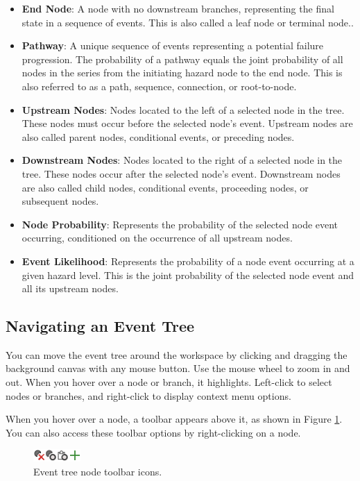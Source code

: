 \documentclass[
]{book}
\begin{document}
\begin{itemize}
\item
  \textbf{End Node}: A node with no downstream branches, representing the final state in a sequence of events. This is also called a leaf node or terminal node..
\item
  \textbf{Pathway}: A unique sequence of events representing a potential failure progression. The probability of a pathway equals the joint probability of all nodes in the series from the initiating hazard node to the end node. This is also referred to as a path, sequence, connection, or root-to-node.
\item
  \textbf{Upstream Nodes}: Nodes located to the left of a selected node in the tree. These nodes must occur before the selected node's event. Upstream nodes are also called parent nodes, conditional events, or preceding nodes.
\item
  \textbf{Downstream Nodes}: Nodes located to the right of a selected node in the tree. These nodes occur after the selected node's event. Downstream nodes are also called child nodes, conditional events, proceeding nodes, or subsequent nodes.
\item
  \textbf{Node Probability}: Represents the probability of the selected node event occurring, conditioned on the occurrence of all upstream nodes.
\item
  \textbf{Event Likelihood}: Represents the probability of a node event occurring at a given hazard level. This is the joint probability of the selected node event and all its upstream nodes.
\end{itemize}

\hypertarget{navigating-an-event-tree}{%
\subsection{Navigating an Event Tree}\label{navigating-an-event-tree}}

You can move the event tree around the workspace by clicking and dragging the background canvas with any mouse button. Use the mouse wheel to zoom in and out. When you hover over a node or branch, it highlights. Left-click to select nodes or branches, and right-click to display context menu options.

When you hover over a node, a toolbar appears above it, as shown in Figure \ref{fig:figure-86}. You can also access these toolbar options by right-clicking on a node.

\begin{figure}

{\centering \includegraphics{images/figure86} 

}

\caption{Event tree node toolbar icons.}\label{fig:figure-86}
\end{figure}
\end{document}
